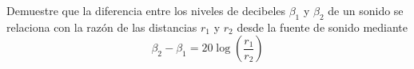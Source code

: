 \item Demuestre que la diferencia entre los niveles de decibeles $\beta_1$ y $\beta_2$ de un sonido se relaciona con la razón de las distancias $r_1$ y $r_2$ desde la fuente de sonido mediante
$$ \beta_2 - \beta_1 = 20 \log\left(\frac{r_1}{r_2}\right) $$